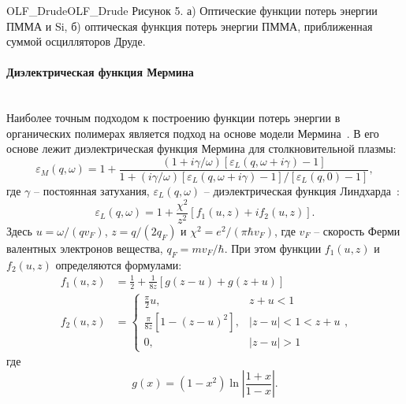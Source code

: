 \begin{fig}{OLF_Drude}{OLF_Drude}
	Рисунок 5. а) Оптические функции потерь энергии ПММА и Si, б) оптическая функция потерь энергии ПММА, приближенная суммой осцилляторов Друде.
\end{fig}


\newpage
\paragraph{Диэлектрическая функция Мермина} \mbox{} \\
\indent Наиболее точным подходом к построению функции потерь энергии в органических полимерах является подход на основе модели Мермина~\cite{Mermin}. В его основе лежит диэлектрическая функция Мермина для столкновительной плазмы:
\begin{equation}
	\varepsilon_M(q, \omega)=1+\frac{(1+i \gamma / \omega)\left[\varepsilon_L(q, \omega+i \gamma)-1\right]}{1+(i \gamma / \omega)\left[\varepsilon_L(q, \omega+i \gamma)-1\right] /\left[\varepsilon_L(q, 0)-1\right]},
\end{equation}
где $\gamma$ -- постоянная затухания, $\varepsilon_L(q, \omega)$ -- диэлектрическая функция Линдхарда~\cite{Lindhard}:
\begin{equation}
	\varepsilon_L(q, \omega)=1+\frac{\chi^2}{z^2}\left[f_1(u, z)+i f_2(u, z)\right].
\end{equation}
Здесь $u=\omega /\left(q v_F\right)$, $z=q /\left(2 q_F\right)$ и $\chi^2=e^2 /\left(\pi \hbar v_F\right)$, где $v_F$
-- скорость Ферми валентных электронов вещества, $q_F=m v_F / \hbar$. При этом функции $f_1(u, z)$ и $f_2(u, z)$ определяются формулами:
\begin{equation}
	\begin{aligned}
		f_1(u, z) &=\frac{1}{2}+\frac{1}{8 z}[g(z-u)+g(z+u)] \\
		f_2(u, z) &= \begin{cases}\frac{\pi}{2} u, & z+u<1 \\
			\frac{\pi}{8 z}\left[1-(z-u)^2\right], & |z-u|<1<z+u \\
			0, & |z-u|>1\end{cases},
	\end{aligned}
\end{equation}
где
\begin{equation}
	g(x)=\left(1-x^2\right) \ln \left|\frac{1+x}{1-x}\right|.
\end{equation}

